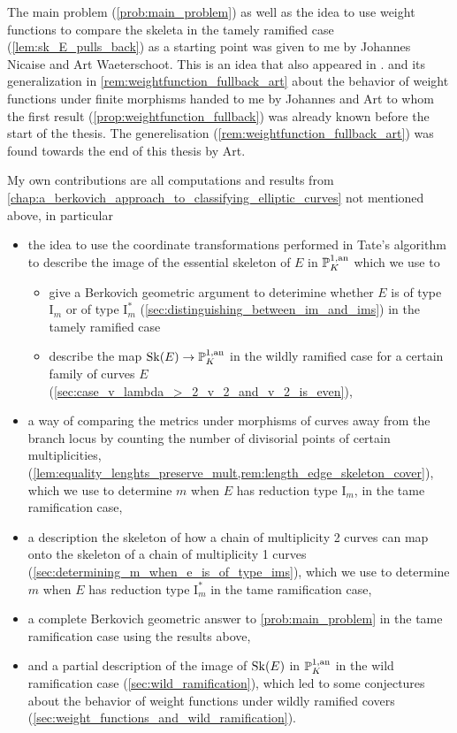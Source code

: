 The main problem (\cref{prob:main_problem}) as well as the idea to use weight functions to compare the skeleta in the tamely ramified case (\cref{lem:sk_E_pulls_back}) as a starting point was given to me by Johannes Nicaise and Art Waeterschoot.
This is an idea that also appeared in \cite[\S 6.1]{brownEssentialSkeletonProduct2019}.
 and its generalization in \cref{rem:weightfunction_fullback_art} about the behavior of weight functions under finite morphisms handed to me by Johannes and Art to whom the first result (\cref{prop:weightfunction_fullback}) was already known before the start of the thesis. 
The generelisation (\cref{rem:weightfunction_fullback_art}) was found towards the end of this thesis by Art.
\medskip

My own contributions are all computations and results from \cref{chap:a_berkovich_approach_to_classifying_elliptic_curves} not mentioned above, in particular
\begin{itemize}
	\item the idea to use the coordinate transformations performed in Tate's algorithm to describe the image of the essential skeleton of $E$ in $\mathbb{P}^{1, \text{an}}_K$ which we use to 
		\begin{itemize}
			\item give a Berkovich geometric argument to deterimine whether $E$ is of type $\mathrm I_m$ or of type $\mathrm I_m^*$ (\cref{sec:distinguishing_between_im_and_ims}) in the tamely ramified case
			\item describe the map $\operatorname{Sk}(E) \to \mathbb{P}^{1, \text{an}}_K$ in the wildly ramified case for a certain family of curves $E$ (\cref{sec:case_v_lambda_>_2_v_2_and_v_2_is_even}),
		\end{itemize}
	\item a way of comparing the metrics under morphisms of curves away from the branch locus by counting the number of divisorial points of certain multiplicities, (\cref{lem:equality_lenghts_preserve_mult,rem:length_edge_skeleton_cover}), which we use to determine $m$ when $E$ has reduction type $\mathrm I_m$, in the tame ramification case, 
	\item a description the skeleton of how a chain of multiplicity 2 curves can map onto the skeleton of a chain of multiplicity 1 curves (\cref{sec:determining_m_when_e_is_of_type_ims}), which we use to determine $m$ when $E$ has reduction type $\mathrm I_m^*$ in the tame ramification case,
	\item a complete Berkovich geometric answer to \cref{prob:main_problem} in the tame ramification case using the results above,
	\item and a partial description of the image of $\operatorname{Sk}(E)$ in $\mathbb{P}^{1, \text{an}}_K$ in the wild ramification case (\cref{sec:wild_ramification}), which led to some conjectures about the behavior of weight functions under wildly ramified covers (\cref{sec:weight_functions_and_wild_ramification}). 
\end{itemize}

